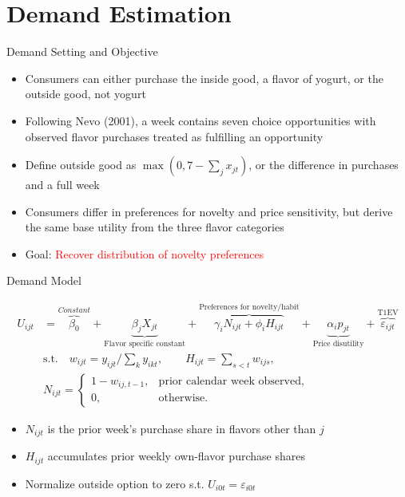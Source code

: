 \documentclass[aspectratio=169,professionalfonts]{beamer}
\begin{document}
\section{Demand Estimation}
\begin{frame}{Demand Setting and Objective}
  \begin{itemize}
    \item Consumers can either purchase the inside good, a flavor of yogurt, or the outside good, not yogurt 
    \item Following Nevo (2001), a week contains seven choice opportunities with observed flavor purchases treated as fulfilling an opportunity 
    \item Define outside good as $\max(0, 7-\sum_j x_{jt})$, or the difference in purchases and a full week
    \item Consumers differ in preferences for novelty and price sensitivity, but derive the same base utility from the three flavor categories
    \item Goal: \textcolor{red}{Recover distribution of novelty preferences}
  \end{itemize}
\end{frame}
\begin{frame}{Demand Model}
  \begin{tcolorbox}
    [
    boxsep=0pt,
    left=2pt, right=2pt,
    top=1pt, bottom=1pt,
    before skip=2pt, after skip=2pt
    ]
    \setlength{\abovedisplayskip}{2pt}
    \setlength{\belowdisplayskip}{2pt}
  \begin{align*}
    U_{ijt} &= \overbrace{\beta_0}^{Constant} + \underbrace{\beta_jX_{jt}}_{\text{Flavor specific constant}} + \overbrace{\gamma_iN_{ijt} + \phi_iH_{ijt}}^{\text{Preferences for novelty/habit}} + \underbrace{\alpha_ip_{jt}}_{\text{Price disutility}} + \overbrace{\varepsilon_{ijt}}^{\text{T1EV}} \\
    &\text{s.t.}\quad w_{ijt}=y_{ijt}/\!\sum_k y_{ikt},\qquad
    H_{ijt}=\sum_{s<t}w_{ijs},\\
    &N_{ijt}=\begin{cases}1-w_{ij,t-1},&\text{prior calendar week observed},\\0,&\text{otherwise}.\end{cases}
  \end{align*}
  \end{tcolorbox}
  \begin{itemize}
    \item $N_{ijt}$ is the prior week's purchase share in flavors other than $j$
    \item $H_{ijt}$ accumulates prior weekly own-flavor purchase shares
    \item Normalize outside option to zero s.t. $U_{i0t} = \varepsilon_{i0t}$
  \end{itemize}
\end{frame}
\end{document}
